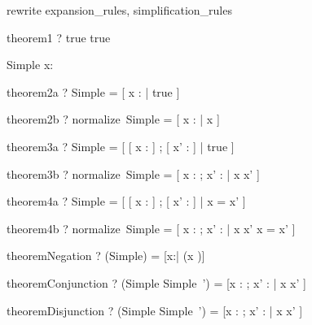 \begin{zsection}
\SECTION rewrite \parents expansion\_rules, simplification\_rules
\end{zsection}

\begin{theorem}{theorem1}
  \vdash? true \iff true
\end{theorem}




\begin{schema}{Simple}
  x: \nat
\end{schema}

\begin{theorem}{theorem2a}
  \vdash? Simple = [ x : \nat | true ]
\end{theorem}

\begin{theorem}{theorem2b}
  \vdash? normalize~Simple = [ x : \arithmos | x \in \nat ]
\end{theorem}

\begin{theorem}{theorem3a}
  \vdash? \Delta Simple = [ [ x : \nat ] ; [ x' : \nat ] | true ]
\end{theorem}

\begin{theorem}{theorem3b}
  \vdash? normalize~\Delta Simple = [ x : \arithmos ; x' : \arithmos | x \in \nat \land x' \in \nat  ]
\end{theorem}

\begin{theorem}{theorem4a}
  \vdash? \Xi Simple =
	    [ [ x : \nat ] ; [ x' : \nat ] | x = x' ]
\end{theorem}

\begin{theorem}{theorem4b}
  \vdash? normalize~\Xi Simple =
	    [ x : \arithmos ; x' : \arithmos | x \in \nat \land x' \in \nat  \land x = x' ]
\end{theorem}

\begin{theorem}{theoremNegation}
  \vdash? (\lnot Simple) = [x:\arithmos | \lnot (x \in \nat)]
\end{theorem}

\begin{theorem}{theoremConjunction}
  \vdash? (Simple \land Simple~') = [x : \arithmos; x' : \arithmos | x \in \nat \land x' \in \nat]
\end{theorem}

\begin{theorem}{theoremDisjunction}
  \vdash? (Simple \lor Simple~') = [x : \arithmos; x' : \arithmos | x \in \nat \lor x' \in \nat]
\end{theorem}

